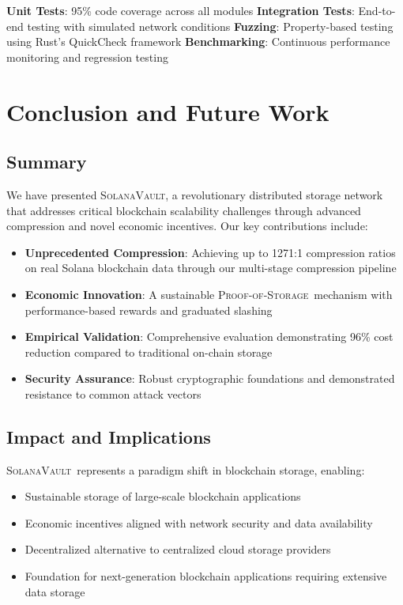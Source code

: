 \documentclass[11pt,a4paper]{article}
\newcommand{\SolanaVault}{\textsc{SolanaVault}}
\newcommand{\ProofOfStorage}{\textsc{Proof-of-Storage}}
\begin{document}
\textbf{Unit Tests}: 95\% code coverage across all modules
\textbf{Integration Tests}: End-to-end testing with simulated network conditions
\textbf{Fuzzing}: Property-based testing using Rust's QuickCheck framework
\textbf{Benchmarking}: Continuous performance monitoring and regression testing

\section{Conclusion and Future Work}
\label{sec:conclusion}

\subsection{Summary}

We have presented \SolanaVault, a revolutionary distributed storage network that addresses critical blockchain scalability challenges through advanced compression and novel economic incentives. Our key contributions include:

\begin{itemize}
\item \textbf{Unprecedented Compression}: Achieving up to 1271:1 compression ratios on real Solana blockchain data through our multi-stage compression pipeline
\item \textbf{Economic Innovation}: A sustainable \ProofOfStorage\ mechanism with performance-based rewards and graduated slashing
\item \textbf{Empirical Validation}: Comprehensive evaluation demonstrating 96\% cost reduction compared to traditional on-chain storage
\item \textbf{Security Assurance}: Robust cryptographic foundations and demonstrated resistance to common attack vectors
\end{itemize}

\subsection{Impact and Implications}

\SolanaVault\ represents a paradigm shift in blockchain storage, enabling:
\begin{itemize}
\item Sustainable storage of large-scale blockchain applications
\item Economic incentives aligned with network security and data availability
\item Decentralized alternative to centralized cloud storage providers
\item Foundation for next-generation blockchain applications requiring extensive data storage
\end{itemize}
\end{document}
